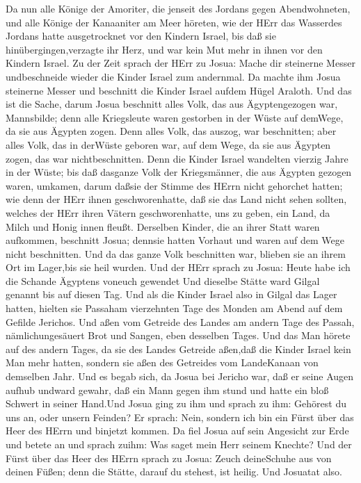  Da nun alle Könige der Amoriter, die jenseit des Jordans
gegen Abendwohneten, und alle Könige der Kanaaniter am Meer höreten, wie
der HErr das Wasserdes Jordans hatte ausgetrocknet vor den Kindern
Israel, bis daß sie hinübergingen,verzagte ihr Herz, und war kein Mut
mehr in ihnen vor den Kindern Israel.  Zu der Zeit sprach
der HErr zu Josua: Mache dir steinerne Messer undbeschneide wieder die
Kinder Israel zum andernmal.  Da machte ihm Josua steinerne
Messer und beschnitt die Kinder Israel aufdem Hügel Araloth.
 Und das ist die Sache, darum Josua beschnitt alles Volk,
das aus Ägyptengezogen war, Mannsbilde; denn alle Kriegsleute waren
gestorben in der Wüste auf demWege, da sie aus Ägypten zogen.
 Denn alles Volk, das auszog, war beschnitten; aber alles
Volk, das in derWüste geboren war, auf dem Wege, da sie aus Ägypten
zogen, das war nichtbeschnitten.  Denn die Kinder Israel
wandelten vierzig Jahre in der Wüste; bis daß dasganze Volk der
Kriegsmänner, die aus Ägypten gezogen waren, umkamen, darum daßsie der
Stimme des HErrn nicht gehorchet hatten; wie denn der HErr ihnen
geschworenhatte, daß sie das Land nicht sehen sollten, welches der HErr
ihren Vätern geschworenhatte, uns zu geben, ein Land, da Milch und Honig
innen fleußt.  Derselben Kinder, die an ihrer Statt waren
aufkommen, beschnitt Josua; dennsie hatten Vorhaut und waren auf dem
Wege nicht beschnitten.  Und da das ganze Volk beschnitten
war, blieben sie an ihrem Ort im Lager,bis sie heil wurden. 
Und der HErr sprach zu Josua: Heute habe ich die Schande Ägyptens
voneuch gewendet Und dieselbe Stätte ward Gilgal genannt bis auf diesen
Tag.  Und als die Kinder Israel also in Gilgal das Lager
hatten, hielten sie Passaham vierzehnten Tage des Monden am Abend auf
dem Gefilde Jerichos.  Und aßen vom Getreide des Landes am
andern Tage des Passah, nämlichungesäuert Brot und Sangen, eben
desselben Tages.  Und das Man hörete auf des andern Tages,
da sie des Landes Getreide aßen,daß die Kinder Israel kein Man mehr
hatten, sondern sie aßen des Getreides vom LandeKanaan von demselben
Jahr.  Und es begab sich, da Josua bei Jericho war, daß er
seine Augen aufhub undward gewahr, daß ein Mann gegen ihm stund und
hatte ein bloß Schwert in seiner Hand.Und Josua ging zu ihm und sprach
zu ihm: Gehörest du uns an, oder unsern Feinden?  Er
sprach: Nein, sondern ich bin ein Fürst über das Heer des HErrn und
binjetzt kommen. Da fiel Josua auf sein Angesicht zur Erde und betete an
und sprach zuihm: Was saget mein Herr seinem Knechte?  Und
der Fürst über das Heer des HErrn sprach zu Josua: Zeuch deineSchuhe aus
von deinen Füßen; denn die Stätte, darauf du stehest, ist heilig. Und
Josuatat also.

